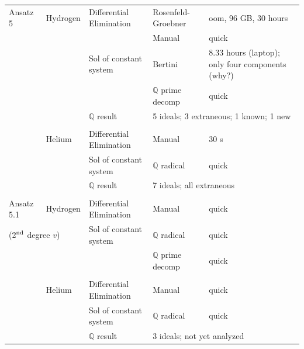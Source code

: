 \documentclass{article}
\begin{document}
\begin{longtable}{lllll}
Ansatz 5   &Hydrogen       &Differential Elimination &Rosenfeld-Groebner    &oom, 96 GB, 30 hours\\
           &               &                         &Manual                &quick\\
           &               &Sol of constant system   &Bertini               &8.33 hours (laptop); only four components (why?)\\
           &               &                         &$\mathbb{Q}$ prime decomp        &quick\\
           &               &$\mathbb{Q}$ result                 &\multicolumn{2}{l}{5 ideals; 3 extraneous; 1 known; 1 new}\\
           &               &                         &                      &\\
           &Helium         &Differential Elimination &Manual                &30 s\\
           &               &Sol of constant system   &$\mathbb{Q}$ radical            &quick\\
           &               &$\mathbb{Q}$ result                 &\multicolumn{2}{l}{7 ideals; all extraneous}\\
           &               &                         &                      &\\
Ansatz 5.1 &Hydrogen       &Differential Elimination &Manual                &quick\\
\multicolumn{2}{l}{(2$^{\rm nd}$ degree $v$)} &Sol of constant system   &$\mathbb{Q}$ radical            &quick\\
           &               &                         &$\mathbb{Q}$ prime decomp        &quick\\
           &               &                         &                      &\\
           &Helium         &Differential Elimination &Manual                &quick\\
           &               &Sol of constant system   &$\mathbb{Q}$ radical            &quick\\
           &               &$\mathbb{Q}$ result                 &\multicolumn{2}{l}{3 ideals; not yet analyzed}\\

\end{longtable}
\end{document}
